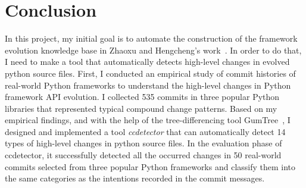 \chapter{Conclusion}
\label{chap:conclusion}

In this project, my initial goal is to automate the construction of the framework evolution knowledge base in Zhaoxu and Hengcheng's work~\cite{DBLP:conf/wcre/ZhangZWTLX20}. In order to do that, I need to make a tool that automatically detects high-level changes in evolved python source files. First, I conducted an empirical study of commit histories of real-world Python frameworks to understand the high-level changes in Python framework API evolution. I collected 535 commits in three popular Python libraries that represented typical compound change patterns. Based on my empirical findings, and with the help of the tree-differencing tool GumTree~\cite{DBLP:conf/kbse/FalleriMBMM14}, I designed and implemented a tool \textit{ccdetector} that can automatically detect 14 types of high-level changes in python source files. In the evaluation phase of ccdetector, it successfully detected all the occurred changes in 50 real-world commits selected from three popular Python frameworks and classify them into the same categories as the intentions recorded in the commit messages.
